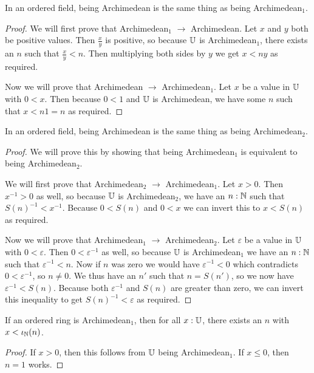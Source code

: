 \documentclass[../../math.tex]{subfiles}
\begin{document}
\begin{theorem}
    In an ordered field, being Archimedean is the same thing as being
    Archimedean$_1$.
\end{theorem}
\begin{proof}
    We will first prove that Archimedean$_1$ $\rightarrow$ Archimedean.  Let $x$
    and $y$ both be positive values.  Then $\frac{x}{y}$ is positive, so because
    $\mathbb{U}$ is Archimedean$_1$, there exists an $n$ such that $\frac{x}{y} < n$.
    Then multiplying both sides by $y$ we get $x < ny$ as required.

    Now we will prove that Archimedean $\rightarrow$ Archimedean$_1$.  Let $x$
    be a value in $\mathbb{U}$ with $0 < x$.  Then because $0 < 1$ and $\mathbb{U}$ is
    Archimedean, we have some $n$ such that $x < n1 = n$ as required.
\end{proof}

\begin{theorem}
    In an ordered field, being Archimedean is the same thing as being
    Archimedean$_2$.
\end{theorem}
\begin{proof}
    We will prove this by showing that being Archimedean$_1$ is equivalent to
    being \linebreak Archimedean$_2$.

    We will first prove that Archimedean$_2$ $\rightarrow$ Archimedean$_1$.  Let
    $x > 0$.  Then $x^{-1} > 0$ as well, so because $\mathbb{U}$ is Archimedean$_2$, we
    have an $n : \mathbb{N}$ such that $S(n)^{-1} < x^{-1}$.  Because $0 < S(n)$ and $0
    < x$ we can invert this to $x < S(n)$ as required.

    Now we will prove that Archimedean$_1$ $\rightarrow$ Archimedean$_2$.  Let
    $\varepsilon$ be a value in $\mathbb{U}$ with $0 < \varepsilon$.  Then
    $0 < \varepsilon^{-1}$ as well, so because $\mathbb{U}$ is Archimedean$_1$ we have
    an $n : \mathbb{N}$ such that $\varepsilon^{-1} < n$.  Now if $n$ was zero we would
    have $\varepsilon^{-1} < 0$ which contradicts $0 < \varepsilon^{-1}$, so $n
    \neq 0$.  We thus have an $n'$ such that $n = S(n')$, so we now have
    $\varepsilon^{-1} < S(n)$.  Because both $\varepsilon^{-1}$ and $S(n)$ are
    greater than zero, we can invert this inequality to get $S(n)^{-1} <
    \varepsilon$ as required.
\end{proof}

\begin{theorem}
    If an ordered ring is Archimedean$_1$, then for all $x : \mathbb{U}$, there exists
    an $n$ with $x < \iota_{\mathbb{N}}(n)$.
\end{theorem}
\begin{proof}
    If $x > 0$, then this follows from $\mathbb{U}$ being Archimedean$_1$.  If $x \leq
    0$, then $n = 1$ works.
\end{proof}
\end{document}
